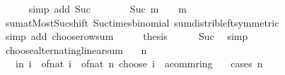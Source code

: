 \begin{isabellebody}
\ \ \ \ \isamarkupfalse%
\ {\isacharparenleft}{\kern0pt}simp\ add{\isacharcolon}{\kern0pt}\ Suc{\isacharparenright}{\kern0pt}\isanewline
\ \ \isamarkupfalse%
\ \isamarkupfalse%
\ {\isachardoublequoteopen}{\isasymdots}\ {\isacharequal}{\kern0pt}\ Suc\ m\ {\isacharasterisk}{\kern0pt}\ {}\ {\isacharcircum}{\kern0pt}\ m{\isachardoublequoteclose}\isanewline
\ \ \ \ \isamarkupfalse%
\ sum{\isachardot}{\kern0pt}atMost{\isacharunderscore}{\kern0pt}Suc{\isacharunderscore}{\kern0pt}shift\ Suc{\isacharunderscore}{\kern0pt}times{\isacharunderscore}{\kern0pt}binomial\ sum{\isacharunderscore}{\kern0pt}distrib{\isacharunderscore}{\kern0pt}left{\isacharbrackleft}{\kern0pt}symmetric{\isacharbrackright}{\kern0pt}\isanewline
\ \ \ \ \isamarkupfalse%
\ {\isacharparenleft}{\kern0pt}simp\ add{\isacharcolon}{\kern0pt}\ choose{\isacharunderscore}{\kern0pt}row{\isacharunderscore}{\kern0pt}sum{\isacharparenright}{\kern0pt}\isanewline
\ \ \isamarkupfalse%
\ \isamarkupfalse%
\ {\isacharquery}{\kern0pt}thesis\isanewline
\ \ \ \ \isamarkupfalse%
\ Suc\ \isamarkupfalse%
\ simp\isanewline
{}\isamarkupfalse%
%
\endisatagproof
{\isafoldproof}%
%
\isadelimproof
\isanewline
%
\endisadelimproof
\isanewline
{}\isamarkupfalse%
\ choose{\isacharunderscore}{\kern0pt}alternating{\isacharunderscore}{\kern0pt}linear{\isacharunderscore}{\kern0pt}sum{\isacharcolon}{\kern0pt}\isanewline
\ \ \ {\isachardoublequoteopen}n\ {\isasymnoteq}\ {}{\isachardoublequoteclose}\isanewline
\ \ \ {\isachardoublequoteopen}{\isacharparenleft}{\kern0pt}{\isasymSum}i{\isasymle}n{\isachardot}{\kern0pt}\ {\isacharparenleft}{\kern0pt}{\isacharminus}{\kern0pt}{}{\isacharparenright}{\kern0pt}{\isacharcircum}{\kern0pt}i\ {\isacharasterisk}{\kern0pt}\ of{\isacharunderscore}{\kern0pt}nat\ i\ {\isacharasterisk}{\kern0pt}\ of{\isacharunderscore}{\kern0pt}nat\ {\isacharparenleft}{\kern0pt}n\ choose\ i{\isacharparenright}{\kern0pt}\ {\isacharcolon}{\kern0pt}{\isacharcolon}{\kern0pt}\ {\isacharprime}{\kern0pt}a{\isacharcolon}{\kern0pt}{\isacharcolon}{\kern0pt}comm{\isacharunderscore}{\kern0pt}ring{\isacharunderscore}{\kern0pt}{}{\isacharparenright}{\kern0pt}\ {\isacharequal}{\kern0pt}\ {}{\isachardoublequoteclose}\isanewline
%
\isadelimproof
%
\endisadelimproof
%
\isatagproof
{}\isamarkupfalse%
\ {\isacharparenleft}{\kern0pt}cases\ n{\isacharparenright}{\kern0pt}\isanewline

\end{isabellebody}
